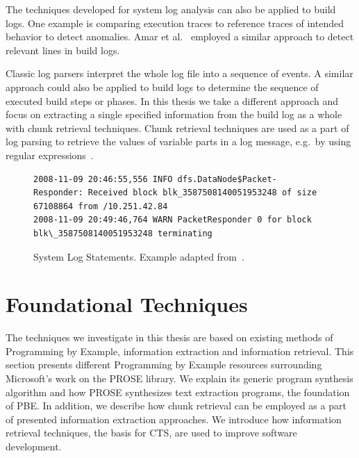 \documentclass[\myrootdir/main.tex]{subfiles}
\begin{document}
The techniques developed for system log analysis can also be applied to build logs.
One example is comparing execution traces to reference traces of intended behavior to detect anomalies.
Amar et al.~\cite{amar2019mining} employed a similar approach to detect relevant lines in build logs.

Classic log parsers interpret the whole log file into a sequence of events.
A similar approach could also be applied to build logs to determine the sequence of executed build steps or phases.
In this thesis we take a different approach and focus on extracting a single specified information from the build log as a whole with chunk retrieval techniques.
Chunk retrieval techniques are used as a part of log parsing to retrieve the values of variable parts in a log message, e.g.\ by using regular expressions~\cite{nagappan2010abstracting,xu2009detecting}.

\begin{figure}[]
  \centering
  \begin{lstlisting}[breaklines=true]
2008-11-09 20:46:55,556 INFO dfs.DataNode$Packet- Responder: Received block blk_3587508140051953248 of size 67108864 from /10.251.42.84
2008-11-09 20:49:46,764 WARN PacketResponder 0 for block blk\_3587508140051953248 terminating
  \end{lstlisting}  
  \caption{System Log Statements. Example adapted from~\cite{he2017towards}.}
  \label{lst:system-log}
\end{figure}

\section{Foundational Techniques}
The techniques we investigate in this thesis are based on existing methods of Programming by Example, information extraction and information retrieval.
This section presents different Programming by Example resources surrounding Microsoft's work on the PROSE library.
We explain its generic program synthesis algorithm and how PROSE synthesizes text extraction programs, the foundation of PBE\@.
In addition, we describe how chunk retrieval can be employed as a part of presented information extraction approaches.
We introduce how information retrieval techniques, the basis for CTS, are used to improve software development.
\end{document}
